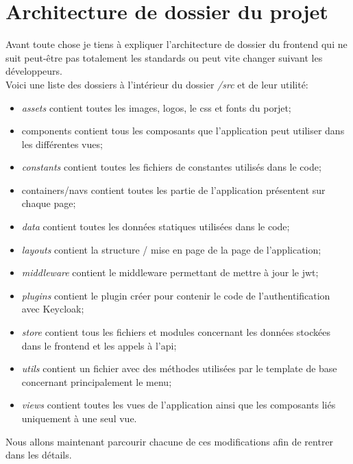 \documentclass[
    iai, %
    il, %
]{heig-tb}
\begin{document}
\section{Architecture de dossier du projet}
Avant toute chose je tiens à expliquer l'architecture de dossier du \Gls{frontend} qui ne suit peut-être pas totalement les standards ou peut vite changer suivant les développeurs. \\
Voici une liste des dossiers à l'intérieur du dossier \emph{/src} et de leur utilité:
\begin{itemize}
    \item \emph{assets} contient toutes les images, logos, le css et fonts du porjet;
    \item components contient tous les composants que l'application peut utiliser dans les différentes vues;
    \item \emph{constants} contient toutes les fichiers de constantes utilisés dans le code;
    \item containers/navs contient toutes les partie de l'application présentent sur chaque page;
    \item \emph{data} contient toutes les données statiques utilisées dans le code;
    \item \emph{layouts} contient la structure / mise en page de la page de l'application;
    \item \emph{middleware} contient le middleware permettant de mettre à jour le \Gls{jwt};
    \item \emph{plugins} contient le plugin créer pour contenir le code de l'authentification avec Keycloak;
    \item \emph{store} contient tous les fichiers et modules concernant les données stockées dans le \Gls{frontend} et les appels à l'\Gls{api};
    \item \emph{utils} contient un fichier avec des méthodes utilisées par le template de base concernant principalement le menu;
    \item \emph{views} contient toutes les vues de l'application ainsi que les composants liés uniquement à une seul vue.
\end{itemize}

Nous allons maintenant parcourir chacune de ces modifications afin de rentrer dans les détails.
\end{document}
